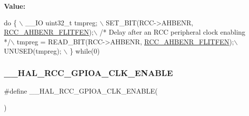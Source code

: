 {\bfseries Value\+:}
\begin{DoxyCode}
\textcolor{keywordflow}{do} \{ \(\backslash\)
                                        \_\_IO uint32\_t tmpreg; \(\backslash\)
                                        SET\_BIT(RCC->AHBENR, \hyperlink{group___peripheral___registers___bits___definition_ga67a12de126652d191a1bc2c114c3395a}{RCC\_AHBENR\_FLITFEN});\(\backslash\)
                                        \textcolor{comment}{/* Delay after an RCC peripheral clock enabling */}\(\backslash\)
                                        tmpreg = READ\_BIT(RCC->AHBENR, 
      \hyperlink{group___peripheral___registers___bits___definition_ga67a12de126652d191a1bc2c114c3395a}{RCC\_AHBENR\_FLITFEN});\(\backslash\)
                                        UNUSED(tmpreg); \(\backslash\)
                                      \} \textcolor{keywordflow}{while}(0)
\end{DoxyCode}
\mbox{\label{group___r_c_c___a_h_b___clock___enable___disable_ga1fde58d775fd2458002df817a68f486e}} 
\subsubsection{\texorpdfstring{\+\_\+\+\_\+\+H\+A\+L\+\_\+\+R\+C\+C\+\_\+\+G\+P\+I\+O\+A\+\_\+\+C\+L\+K\+\_\+\+E\+N\+A\+B\+LE}{\_\_HAL\_RCC\_GPIOA\_CLK\_ENABLE}}
{\footnotesize\ttfamily \#define \+\_\+\+\_\+\+H\+A\+L\+\_\+\+R\+C\+C\+\_\+\+G\+P\+I\+O\+A\+\_\+\+C\+L\+K\+\_\+\+E\+N\+A\+B\+LE(\begin{DoxyParamCaption}{ }\end{DoxyParamCaption})}

